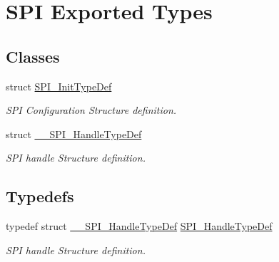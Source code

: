 \hypertarget{group___s_p_i___exported___types}{}\section{S\+PI Exported Types}
\label{group___s_p_i___exported___types}
\subsection*{Classes}
\begin{DoxyCompactItemize}
\item 
struct \mbox{\hyperlink{struct_s_p_i___init_type_def}{S\+P\+I\+\_\+\+Init\+Type\+Def}}
\begin{DoxyCompactList}\small\item\em S\+PI Configuration Structure definition. \end{DoxyCompactList}\item 
struct \mbox{\hyperlink{struct_____s_p_i___handle_type_def}{\+\_\+\+\_\+\+S\+P\+I\+\_\+\+Handle\+Type\+Def}}
\begin{DoxyCompactList}\small\item\em S\+PI handle Structure definition. \end{DoxyCompactList}\end{DoxyCompactItemize}
\subsection*{Typedefs}
\begin{DoxyCompactItemize}
\item 
\mbox{\label{group___s_p_i___exported___types_gab3bd115785297692c125528b7293566b}} 
typedef struct \mbox{\hyperlink{struct_____s_p_i___handle_type_def}{\+\_\+\+\_\+\+S\+P\+I\+\_\+\+Handle\+Type\+Def}} \mbox{\hyperlink{group___s_p_i___exported___types_gab3bd115785297692c125528b7293566b}{S\+P\+I\+\_\+\+Handle\+Type\+Def}}
\begin{DoxyCompactList}\small\item\em S\+PI handle Structure definition. \end{DoxyCompactList}\end{DoxyCompactItemize}
